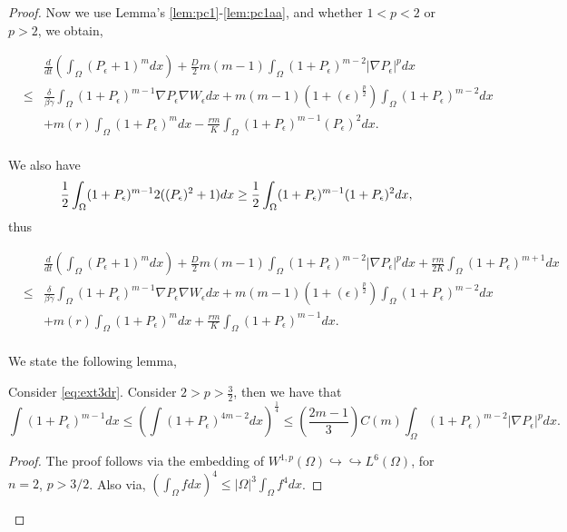 \documentclass[10pt,a4paper]{amsart}
\begin{document}
\begin{proof}

Now we use Lemma's \ref{lem:pc1}-\ref{lem:pc1aa}, and whether $1<p<2$ or $p>2$, we obtain,

\begin{eqnarray}
   && \frac{d}{dt}\left(\int_{\Omega} (P_{\epsilon} +1)^{m}dx\right)+\frac{D}{2}m(m-1) \int_{\Omega} (1+P_{\epsilon})^{m-2}|\nabla P_{\epsilon}|^{p} dx  \nonumber \\ 
&\leq& \frac{\delta}{\beta \gamma}\int_{\Omega} (1+P_{\epsilon})^{m-1} \nabla P_{\epsilon} \nabla W_{\epsilon}dx  + m(m-1)(1+(\epsilon)^{\frac{p}{2}})\int_{\Omega} (1+P_{\epsilon})^{m-2}dx \nonumber \\ 
   && + m(r)\int_{\Omega} (1+P_{\epsilon})^{m}dx -\frac{rm}{K}\int_{\Omega} (1+P_{\epsilon})^{m-1}(P_{\epsilon})^{2} dx. \nonumber  \\
        \end{eqnarray}


We also have 
\begin{equation}
\label{eq:mm1}
   \frac{1}{2} \int_{\Omega} (1+P_{\epsilon})^{m-1}2((P_{\epsilon})^{2}+1) dx \nonumber \\ 
\geq \frac{1}{2} \int_{\Omega} (1+P_{\epsilon})^{m-1}(1+P_{\epsilon})^{2}dx,\nonumber 
        \end{equation}
thus 

\begin{eqnarray}
\label{eq:11e}
   && \frac{d}{dt}\left(\int_{\Omega} (P_{\epsilon} +1)^{m}dx\right)+\frac{D}{2}m(m-1) \int_{\Omega} (1+P_{\epsilon})^{m-2}|\nabla P_{\epsilon}|^{p} dx  
   + \frac{rm}{2K} \int_{\Omega} (1+P_{\epsilon})^{m+1}dx\nonumber \\ 
&\leq& \frac{\delta}{\beta \gamma}\int_{\Omega} (1+P_{\epsilon})^{m-1} \nabla P_{\epsilon} \nabla W_{\epsilon}dx  + m(m-1)(1+(\epsilon)^{\frac{p}{2}})\int_{\Omega} (1+P_{\epsilon})^{m-2}dx \nonumber \\ 
   && + m(r)\int_{\Omega} (1+P_{\epsilon})^{m}dx 
   +\frac{rm}{K} \int_{\Omega} (1+P_{\epsilon})^{m-1}dx.
   \nonumber  \\
        \end{eqnarray}

        We state the following lemma,
        \begin{lemma}
        \label{lem:pe21}
            Consider \eqref{eq:ext3dr}. Consider $2>p>\frac{3}{2}$, then we have that 
\begin{equation}
 \int (1+P_{\epsilon})^{m-1}dx \leq  \left(\int (1+P_{\epsilon})^{4m-2}dx\right)^{\frac{1}{4}} \leq \left( \frac{2m-1}{3}\right)C(m) \int_{\Omega} (1+P_{\epsilon})^{m-2}|\nabla P_{\epsilon}|^{p} dx.
        \end{equation}
\begin{proof}
    The proof follows via the embedding of $W^{1,p}(\Omega) \hookrightarrow \hookrightarrow L^{6}(\Omega)$, for $n=2$, $p>3/2$. Also via, $(\int_{\Omega}fdx)^{4} \leq |\Omega|^{3}\int_{\Omega}f^{4}dx$.
\end{proof}



\end{lemma}
\end{proof}
\end{document}
